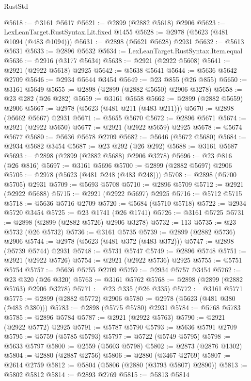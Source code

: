 \begin{lexlean}{RustStd}
\begin{coremodule}
@5618 := @3161 @5617
@5621 := @2899 (@2882 @5618) @2906
@5623 := LexLeanTarget.RustSyntax.Lit.fixed @1455
@5628 := @2978 (@5623 (@481 @1094 (@483 @1094)))
@5631 := @2898 (@5621 @5628) @2931
@5632 := @5613 @5631
@5633 := @2896 @5632
@5634 := LexLeanTarget.RustSyntax.Item.equal
@5636 := @2916 (@3177 @5634)
@5638 := @2921 (@2922 @5608)
@5641 := @2921 (@2922 @5618) @2925
@5642 := @5638 @5641
@5644 := @5636 @5642 @2709
@5646 := @2934 @5644 @3454
@5649 := @23 @855 (@26 @855)
@5650 := @3161 @5649
@5655 := @2898 (@2899 (@2882 @5650) @2906 @3278)
@5658 := @23 @282 (@26 @282)
@5659 := @3161 @5658
@5662 := @2899 (@2882 @5659) @2906
@5667 := @2978 (@5623 (@481 @211 (@483 @211)))
@5670 := @2898 (@5662 @5667) @2931
@5671 := @5655 @5670
@5672 := @2896 @5671
@5674 := @2921 (@2922 @5650)
@5677 := @2921 (@2922 @5659) @2925
@5678 := @5674 @5677
@5680 := @5636 @5678 @2709
@5682 := @5646 (@5672 @5680)
@5684 := @2934 @5682 @3454
@5687 := @23 @292 (@26 @292)
@5688 := @3161 @5687
@5693 := @2898 (@2899 (@2882 @5688) @2906 @3278)
@5696 := @23 @816 (@26 @816)
@5697 := @3161 @5696
@5700 := @2899 (@2882 @5697) @2906
@5705 := @2978 (@5623 (@481 @248 (@483 @248)))
@5708 := @2898 (@5700 @5705) @2931
@5709 := @5693 @5708
@5710 := @2896 @5709
@5712 := @2921 (@2922 @5688)
@5715 := @2921 (@2922 @5697) @2925
@5716 := @5712 @5715
@5718 := @5636 @5716 @2709
@5720 := @5684 (@5710 @5718)
@5722 := @2934 @5720 @3454
@5725 := @23 @1741 (@26 @1741)
@5726 := @3161 @5725
@5731 := @2898 (@2899 (@2882 @5726) @2906 @3278)
@5732 := 113
@5735 := @23 @5732 (@26 @5732)
@5736 := @3161 @5735
@5739 := @2899 (@2882 @5736) @2906
@5744 := @2978 (@5623 (@481 @372 (@483 @372)))
@5747 := @2898 (@5739 @5744) @2931
@5748 := @5731 @5747
@5749 := @2896 @5748
@5751 := @2921 (@2922 @5726)
@5754 := @2921 (@2922 @5736) @2925
@5755 := @5751 @5754
@5757 := @5636 @5755 @2709
@5759 := @2934 @5757 @3454
@5762 := @23 @320 (@26 @320)
@5763 := @3161 @5762
@5768 := @2898 (@2899 (@2882 @5763) @2906 @3278)
@5771 := @23 @335 (@26 @335)
@5772 := @3161 @5771
@5775 := @2899 (@2882 @5772) @2906
@5780 := @2978 (@5623 (@481 @380 (@483 @380)))
@5783 := @2898 (@5775 @5780) @2931
@5784 := @5768 @5783
@5785 := @2896 @5784
@5787 := @2921 (@2922 @5763)
@5790 := @2921 (@2922 @5772) @2925
@5791 := @5787 @5790
@5793 := @5636 @5791 @2709
@5795 := @5759 (@5785 @5793)
@5797 := @5722 (@5749 @5795)
@5798 := @5633 @5797
@5800 := @2559 (@5603 @5798)
@5802 := @2873 (@2876 @1302)
@5804 := @2880 (@2887 @2756)
@5806 := @2880 (@3467 @2769)
@5807 := @2614 @2759
@5812 := @5804 (@5806 (@2880 (@3793 @5807) @2890))
@5813 := @5802 @5812
@5814 := @2893 @2769
@5815 := @5813 @5814

\end{coremodule}
\end{lexlean}
